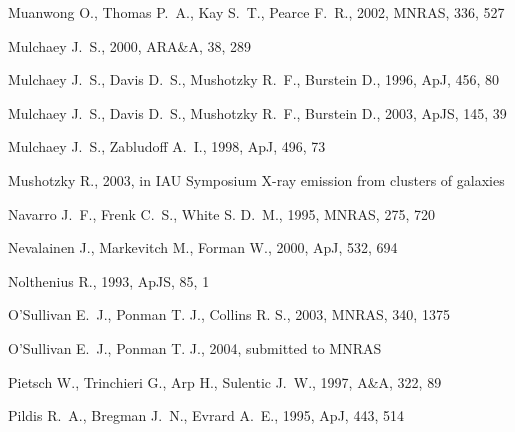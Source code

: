 \documentclass[usenatbib]{mn2e}
\begin{document}
\begin{thebibliography}{}
Muanwong O.,  Thomas P.~A.,  Kay S.~T.,    Pearce F.~R.,  2002, MNRAS, 336, 527

Mulchaey J.~S.,  2000, ARA\&A, 38, 289

Mulchaey J.~S.,  Davis D.~S.,  Mushotzky R.~F.,    Burstein D.,  1996, ApJ,
  456, 80

Mulchaey J.~S.,  Davis D.~S.,  Mushotzky R.~F.,    Burstein D.,  2003, ApJS,
  145, 39

Mulchaey J.~S.,  Zabludoff A.~I.,  1998, ApJ, 496, 73

Mushotzky R.,  2003, in IAU Symposium X-ray emission from clusters of galaxies

Navarro J.~F.,  Frenk C.~S.,    White S. D.~M.,  1995, MNRAS, 275, 720

Nevalainen J.,  Markevitch M.,    Forman W.,  2000, ApJ, 532, 694

Nolthenius R.,  1993, ApJS, 85, 1

O'Sullivan E.~J., Ponman T. J., Collins R. S.,  2003, MNRAS, 340, 1375

O'Sullivan E.~J., Ponman T. J., 2004, submitted to MNRAS

Pietsch W.,  Trinchieri G.,  Arp H.,    Sulentic J.~W.,  1997, A\&A, 322, 89

Pildis R.~A.,  Bregman J.~N.,    Evrard A.~E.,  1995, ApJ, 443, 514


\end{thebibliography}
\end{document}
